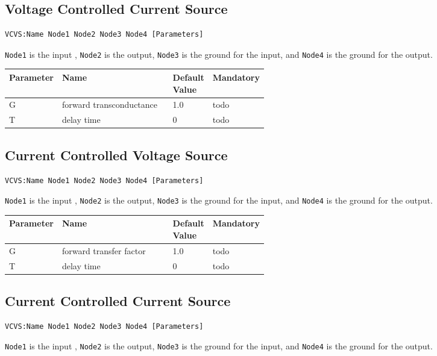\subsection{Voltage Controlled Current Source}

\begin{verbatim}
VCVS:Name Node1 Node2 Node3 Node4 [Parameters]
\end{verbatim}

\verb+Node1+ is the input , \verb+Node2+ is the output, \verb+Node3+ is the ground for the input, and \verb+Node4+ is the ground for the output.


\begin{tabular}{|l|p{0.5\linewidth}|l|l|}
\hline
Parameter & Name & Default Value & Mandatory \\
\hline
G & forward transconductance & 1.0 & todo \\
T & delay time & 0 & todo \\
\hline
\end{tabular}


\subsection{Current Controlled Voltage Source}

\begin{verbatim}
VCVS:Name Node1 Node2 Node3 Node4 [Parameters]
\end{verbatim}

\verb+Node1+ is the input , \verb+Node2+ is the output, \verb+Node3+ is the ground for the input, and \verb+Node4+ is the ground for the output.


\begin{tabular}{|l|p{0.5\linewidth}|l|l|}
\hline
Parameter & Name & Default Value & Mandatory \\
\hline
G & forward transfer factor & 1.0 & todo \\
T & delay time & 0 & todo \\
\hline
\end{tabular}


\subsection{Current Controlled Current Source}

\begin{verbatim}
VCVS:Name Node1 Node2 Node3 Node4 [Parameters]
\end{verbatim}

\verb+Node1+ is the input , \verb+Node2+ is the output, \verb+Node3+ is the ground for the input, and \verb+Node4+ is the ground for the output.


